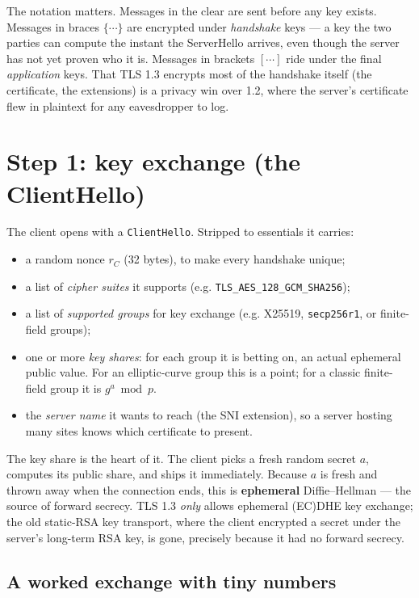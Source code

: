 The notation matters. Messages in the clear are sent before any key exists.
Messages in braces $\{\cdots\}$ are encrypted under \emph{handshake} keys --- a key
the two parties can compute the instant the ServerHello arrives, even though the
server has not yet proven who it is. Messages in brackets $[\cdots]$ ride under the
final \emph{application} keys. That TLS 1.3 encrypts most of the handshake itself
(the certificate, the extensions) is a privacy win over 1.2, where the server's
certificate flew in plaintext for any eavesdropper to log.

\section{Step 1: key exchange (the ClientHello)}

The client opens with a \texttt{ClientHello}. Stripped to essentials it carries:

\begin{itemize}
\item a random nonce $r_C$ (32 bytes), to make every handshake unique;
\item a list of \emph{cipher suites} it supports (e.g.
\texttt{TLS\_AES\_128\_GCM\_SHA256});
\item a list of \emph{supported groups} for key exchange (e.g. X25519,
\texttt{secp256r1}, or finite-field groups);
\item one or more \emph{key shares}: for each group it is betting on, an actual
ephemeral public value. For an elliptic-curve group this is a point; for a
classic finite-field group it is $g^a \bmod p$.
\item the \emph{server name} it wants to reach (the SNI extension), so a server
hosting many sites knows which certificate to present.
\end{itemize}

The key share is the heart of it. The client picks a fresh random secret $a$,
computes its public share, and ships it immediately. Because $a$ is fresh and
thrown away when the connection ends, this is \textbf{ephemeral} Diffie--Hellman ---
the source of forward secrecy. TLS 1.3 \emph{only} allows ephemeral
(EC)DHE key exchange; the old static-RSA key transport, where the client encrypted
a secret under the server's long-term RSA key, is gone, precisely because it had no
forward secrecy.

\subsection{A worked exchange with tiny numbers}

